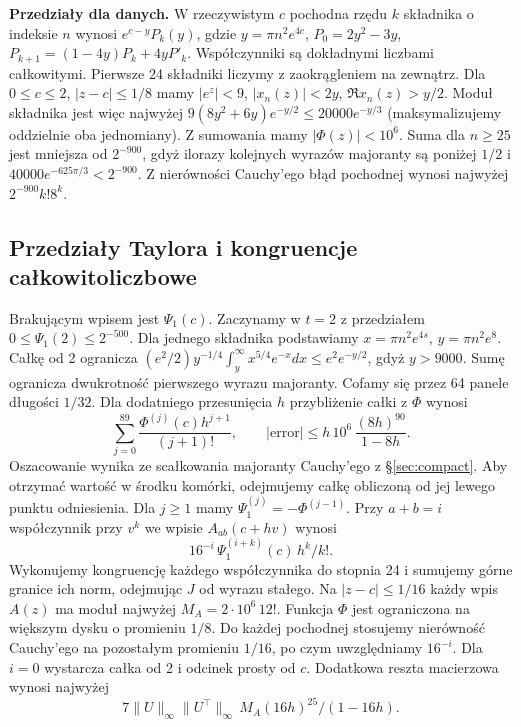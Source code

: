 \documentclass[11pt,a4paper,reqno]{amsart}
\numberwithin{equation}{section}
\begin{document}
\textbf{Przedziały dla danych.} W rzeczywistym \(c\) pochodna rzędu \(k\) składnika o indeksie \(n\) wynosi \(e^{c-y}P_k(y)\), gdzie \(y=\pi n^2e^{4c}\), \(P_0=2y^2-3y\), \(P_{k+1}=(1-4y)P_k+4yP'_k\). Współczynniki są dokładnymi liczbami całkowitymi. Pierwsze 24 składniki liczymy z zaokrągleniem na zewnątrz. Dla \(0\le c\le2\), \(|z-c|\le1/8\) mamy \(|e^z|<9\), \(|x_n(z)|<2y\), \(\Re x_n(z)>y/2\). Moduł składnika jest więc najwyżej \(9(8y^2+6y)e^{-y/2}\le20000e^{-y/3}\) (maksymalizujemy oddzielnie oba jednomiany). Z sumowania mamy \(|\Phi(z)|<10^6\). Suma dla \(n\ge25\) jest mniejsza od \(2^{-900}\), gdyż ilorazy kolejnych wyrazów majoranty są poniżej \(1/2\) i \(40000e^{-625\pi/3}<2^{-900}\). Z nierówności Cauchy'ego błąd pochodnej wynosi najwyżej \(2^{-900}k!8^k\).

\subsection{Przedziały Taylora i kongruencje całkowitoliczbowe}\label{sec:jet}


Brakującym wpisem jest \(\Psi_1(c)\). Zaczynamy w \(t=2\) z przedziałem \(0\le\Psi_1(2)\le2^{-500}\). Dla jednego składnika podstawiamy \(x=\pi n^2e^{4s}\), \(y=\pi n^2e^8\). Całkę od 2 ogranicza \((e^2/2)y^{-1/4}\int_y^\infty x^{5/4}e^{-x}dx\le e^2e^{-y/2}\), gdyż \(y>9000\). Sumę ogranicza dwukrotność pierwszego wyrazu majoranty. Cofamy się przez 64 panele długości \(1/32\). Dla dodatniego przesunięcia \(h\) przybliżenie całki z \(\Phi\) wynosi \[\sum_{j=0}^{89}\frac{\Phi^{(j)}(c)h^{j+1}}{(j+1)!},\qquad
|\text{error}|\le h\,10^6\,\frac{(8h)^{90}}{1-8h}.\] Oszacowanie wynika ze scałkowania majoranty Cauchy'ego z \S\ref{sec:compact}. Aby otrzymać wartość w środku komórki, odejmujemy całkę obliczoną od jej lewego punktu odniesienia. Dla \(j\ge1\) mamy \(\Psi_1^{(j)}=-\Phi^{(j-1)}\). Przy \(a+b=i\) współczynnik przy \(v^k\) we wpisie \(A_{ab}(c+hv)\) wynosi \[16^{-i}\,\Psi_1^{(i+k)}(c)\,h^k/k!.\] Wykonujemy kongruencję każdego współczynnika do stopnia 24 i sumujemy górne granice ich norm, odejmując \(J\) od wyrazu stałego. Na \(|z-c|\le1/16\) każdy wpis \(A(z)\) ma moduł najwyżej \(M_A=2\cdot10^6\,12!\). Funkcja \(\Phi\) jest ograniczona na większym dysku o promieniu \(1/8\). Do każdej pochodnej stosujemy nierówność Cauchy'ego na pozostałym promieniu \(1/16\), po czym uwzględniamy \(16^{-i}\). Dla \(i=0\) wystarcza całka od 2 i odcinek prosty od \(c\). Dodatkowa reszta macierzowa wynosi najwyżej \[7\|U\|_\infty\|U^\top\|_\infty\,M_A(16h)^{25}/(1-16h).\] 
\end{document}

